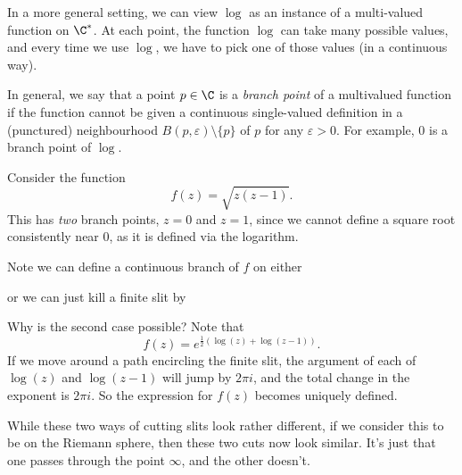 \documentclass[a4paper]{article}
\begin{document}
In a more general setting, we can view $\log$ as an instance of a multi-valued function on $\C^*$. At each point, the function $\log$ can take many possible values, and every time we use $\log$, we have to pick one of those values (in a continuous way).

In general, we say that a point $p \in \C $ is a \emph{branch point} of a multivalued function if the function cannot be given a continuous single-valued definition in a (punctured) neighbourhood $B(p, \varepsilon) \setminus \{p\}$ of $p$ for any $\varepsilon > 0$. For example, $0$ is a branch point of $\log$.

\begin{eg}
  Consider the function
  \[
    f(z) = \sqrt{z(z - 1)}.
  \]
  This has \emph{two} branch points, $z = 0$ and $z = 1$, since we cannot define a square root consistently near $0$, as it is defined via the logarithm.
\end{eg}

Note we can define a continuous branch of $f$ on either
\begin{center}
\end{center}
or we can just kill a finite slit by
\begin{center}
\end{center}
Why is the second case possible? Note that
\[
  f(z) = e^{\frac{1}{2}(\log(z) + \log(z - 1))}.
\]
If we move around a path encircling the finite slit, the argument of each of $\log(z)$ and $\log(z - 1)$ will jump by $2\pi i$, and the total change in the exponent is $2\pi i$. So the expression for $f(z)$ becomes uniquely defined.

While these two ways of cutting slits look rather different, if we consider this to be on the Riemann sphere, then these two cuts now look similar. It's just that one passes through the point $\infty$, and the other doesn't.
\end{document}

